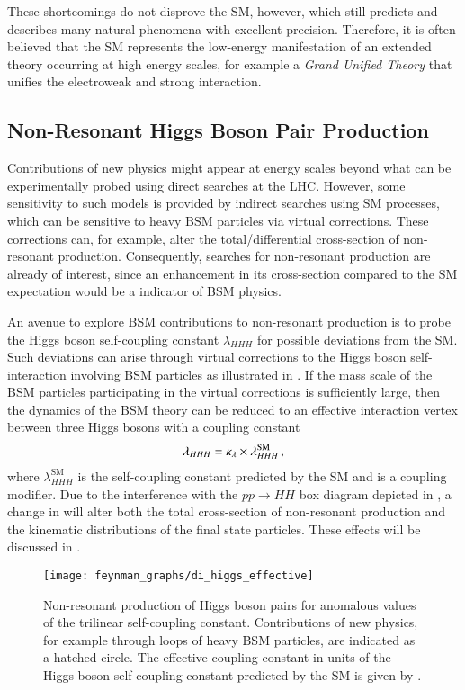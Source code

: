 These shortcomings do not disprove the SM, however, which still predicts and
describes many natural phenomena with excellent precision. Therefore, it is
often believed that the SM represents the low-energy manifestation of an
extended theory occurring at high energy scales, for example a \emph{Grand
  Unified Theory} that unifies the electroweak and strong interaction.


\subsection{Non-Resonant Higgs Boson Pair Production}%
\label{sec:bsm_nonresonant_hh}

Contributions of new physics might appear at energy scales beyond what can be
experimentally probed using direct searches at the LHC. However, some
sensitivity to such models is provided by indirect searches using SM processes,
which can be sensitive to heavy BSM particles via virtual corrections. These
corrections can, for example, alter the total/differential cross-section of
non-resonant \HH production. Consequently, searches for non-resonant \HH
production are already of interest, since an enhancement in its cross-section
compared to the SM expectation would be a indicator of BSM physics.

An avenue to explore BSM contributions to non-resonant \HH production is to
probe the Higgs boson self-coupling constant $\lambda_{HHH}$ for possible
deviations from the SM. Such deviations can arise through virtual corrections to
the Higgs boson self-interaction involving BSM particles as illustrated in
. If the mass scale of the BSM particles
participating in the virtual corrections is sufficiently large, then the
dynamics of the BSM theory can be reduced to an effective interaction vertex
between three Higgs bosons with a coupling constant
\begin{align*}
  \lambda_{HHH} = \kappa_{\lambda} \times \lambda_{HHH}^{\text{SM}} \,\text{,}
\end{align*}
where $\lambda_{HHH}^{\text{SM}}$ is the self-coupling constant predicted by the
SM and \klambda is a coupling modifier. Due to the interference with the
$pp \to HH$ box diagram depicted in , a change in
\klambda will alter both the total cross-section of non-resonant \HH production
and the kinematic distributions of the final state particles. These effects will
be discussed in .

\begin{figure}[htbp]
  \centering

  \texttt{[image: feynman\_graphs/di\_higgs\_effective]}

  \caption{Non-resonant production of Higgs boson pairs for anomalous values of
    the trilinear self-coupling constant.  Contributions of new physics, for
    example through loops of heavy BSM particles, are indicated as a hatched
    circle. The effective coupling constant in units of the Higgs boson
    self-coupling constant predicted by the SM is given by \klambda.}%
  \label{fig:bsm_hh_prod_feyn}
\end{figure}

